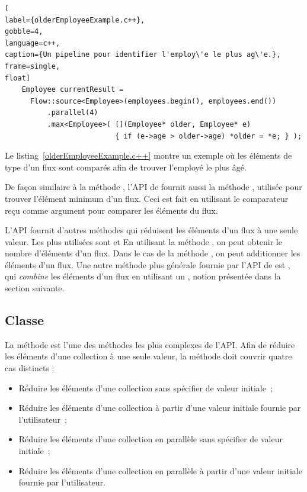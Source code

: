 \begin{lstlisting}[
label={olderEmployeeExample.c++},
gobble=4,
language=c++,
caption={Un pipeline pour identifier l'employ\'e le plus ag\'e.},
frame=single,
float]
    Employee currentResult = 
      Flow::source<Employee>(employees.begin(), employees.end())
          .parallel(4)
          .max<Employee>( [](Employee* older, Employee* e) 
                          { if (e->age > older->age) *older = *e; } );
\end{lstlisting}



Le listing~\ref{olderEmployeeExample.c++} montre un exemple o\`u les \'el\'ements de type  d'un flux sont compar\'es afin de trouver l'employ\'e le plus \^ag\'e.


De façon similaire \`a la m\'ethode , l’API de  fournit aussi la m\'ethode , utilis\'ee pour trouver l'\'el\'ement minimum d'un flux. Ceci est fait en utilisant le comparateur re\c{c}u comme argument pour comparer les \'el\'ements du flux.

L'{API} fournit d'autres m\'ethodes qui r\'eduisent les \'el\'ements d'un flux \`a une seule valeur. Les plus utilis\'ees sont  et  En utilisant la m\'ethode , on peut obtenir le nombre d'\'el\'ements d'un flux. Dans le cas de la m\'ethode , on peut additionner les \'el\'ements d'un flux. Une autre m\'ethode plus g\'en\'erale fournie par l'{API} de  est , qui \emph{combine} les \'el\'ements d'un flux en utilisant un , notion pr\'esent\'ee dans la section suivante.


\subsection{Classe }

\label{reducer.sect}

La m\'ethode  est l'une des m\'ethodes les plus complexes de l'API. Afin de r\'eduire les \'el\'ements d'une collection \`a une seule valeur, la m\'ethode  doit couvrir quatre cas distincts : 

\begin{itemize}
\item R\'eduire les \'el\'ements d'une collection sans spécifier de valeur initiale~; 

\item R\'eduire les \'el\'ements d'une collection \`a partir d'une valeur initiale fournie par l'utilisateur~; 

\item R\'eduire les \'el\'ements d'une collection en parall\`ele sans spécifier de valeur initiale~; 

\item R\'eduire les \'el\'ements d'une collection en parall\`ele \`a partir d'une valeur initiale fournie par l'utilisateur.
\end{itemize}

